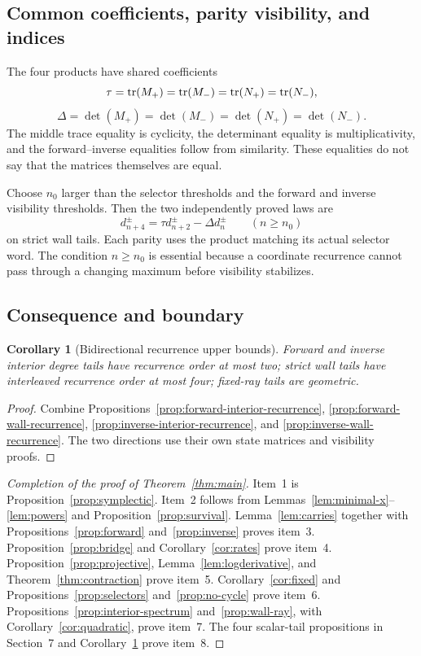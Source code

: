 \documentclass[11pt]{article}
\newtheorem{corollary}[theorem]{Corollary}
\theoremstyle{definition}
\theoremstyle{remark}
\begin{document}
\subsection{Common coefficients, parity visibility, and indices}

The four products have shared coefficients
\[
\tau=\operatorname{tr}(M_+)=\operatorname{tr}(M_-)=\operatorname{tr}(N_+)=\operatorname{tr}(N_-),
\]
\[
\Delta=\det(M_+)=\det(M_-)=\det(N_+)=\det(N_-).
\]
The middle trace equality is cyclicity, the determinant equality is
multiplicativity, and the forward--inverse equalities follow from
similarity.  These equalities do not say that the matrices themselves are
equal.

Choose \(n_0\) larger than the selector thresholds and the forward and
inverse visibility thresholds.  Then the two independently proved laws
are
\[
d^\pm_{n+4}=\tau d^\pm_{n+2}-\Delta d^\pm_n
\qquad(n\geq n_0)
\]
on strict wall tails.  Each parity uses the product matching its actual
selector word.  The condition \(n\geq n_0\) is essential because a
coordinate recurrence cannot pass through a changing maximum before
visibility stabilizes.

\subsection{Consequence and boundary}

\begin{corollary}[Bidirectional recurrence upper bounds]
\label{cor:recurrences}
Forward and inverse interior degree tails have recurrence order at most
two; strict wall tails have interleaved recurrence order at most four;
fixed-ray tails are geometric.
\end{corollary}

\begin{proof}
Combine Propositions~\ref{prop:forward-interior-recurrence},
\ref{prop:forward-wall-recurrence},
\ref{prop:inverse-interior-recurrence}, and
\ref{prop:inverse-wall-recurrence}.  The two directions use their own
state matrices and visibility proofs.
\end{proof}

\begin{proof}[Completion of the proof of Theorem~\ref{thm:main}]
Item~1 is Proposition~\ref{prop:symplectic}.  Item~2 follows from
Lemmas~\ref{lem:minimal-x}--\ref{lem:powers} and
Proposition~\ref{prop:survival}.  Lemma~\ref{lem:carries} together with
Propositions~\ref{prop:forward} and~\ref{prop:inverse} proves item~3.
Proposition~\ref{prop:bridge} and Corollary~\ref{cor:rates} prove item~4.
Proposition~\ref{prop:projective}, Lemma~\ref{lem:logderivative}, and
Theorem~\ref{thm:contraction} prove item~5.  Corollary~\ref{cor:fixed} and
Propositions~\ref{prop:selectors} and~\ref{prop:no-cycle} prove item~6.
Propositions~\ref{prop:interior-spectrum} and~\ref{prop:wall-ray}, with
Corollary~\ref{cor:quadratic}, prove item~7.  The four scalar-tail
propositions in Section~7 and Corollary~\ref{cor:recurrences} prove item~8.
\end{proof}
\end{document}
